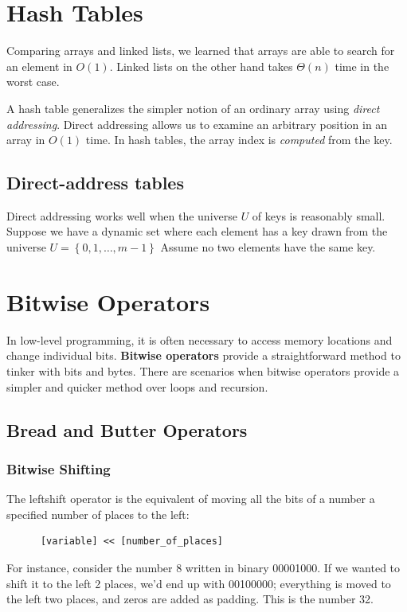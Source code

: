 \documentclass[]{book}
\begin{document}
  \chapter{Hash Tables}
    Comparing arrays and linked lists, we learned that arrays are able to search for an element
    in $O(1)$. Linked lists on the other hand takes $\Theta(n)$ time in the worst case.

    A hash table generalizes the simpler notion of an ordinary array using \textit{direct addressing}. 
    Direct addressing allows us to examine an arbitrary position in an array in $O(1)$ time. In
    hash tables, the array index is \textit{computed} from the key.

    \section{Direct-address tables}
      Direct addressing works well when the universe $U$ of keys is reasonably small.
      Suppose we have a dynamic set where each element has a key drawn from the universe $U = \left\{ 0,1, \ldots, m - 1 \right\}$
      Assume no two elements have the same key.

  \chapter{Bitwise Operators}
    In low-level programming, it is often necessary to access memory locations and change individual bits.
    \textbf{Bitwise operators} provide a straightforward method to tinker with bits and bytes. There are
    scenarios when bitwise operators provide a simpler and quicker method over loops and recursion.
    \section{Bread and Butter Operators}
    \subsection*{Bitwise Shifting}
    The leftshift operator is the equivalent of moving all the bits of a number a specified number of places to the left:
    \begin{verbatim}
      [variable] << [number_of_places]
    \end{verbatim}
    For instance, consider the number 8 written in binary 00001000. If we wanted to shift it to the left 2 places, we'd end up with
    00100000; everything is moved to the left two places, and zeros are added as padding. This is the number 32.
\end{document}
